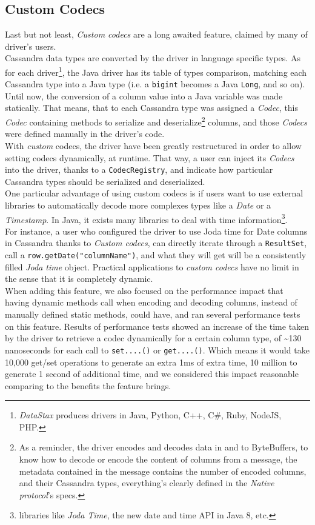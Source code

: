 \documentclass[a4paper]{report}
\newcommand{\ds}{\emph{DataStax\xspace}}
\begin{document}
\subsection{Custom Codecs}
Last but not least, \emph{Custom codecs} are a long awaited feature, claimed by many of driver's users.\\
Cassandra data types are converted by the driver in language specific types. As for each driver\footnote{\ds{} produces drivers in Java, Python, C++, C\#, Ruby, NodeJS, PHP.}, the Java driver has its table of types comparison, matching each Cassandra type into a Java type (i.e. a \verb;bigint; becomes a Java \verb;Long;, and so on). Until now, the conversion of a column value into a Java variable was made statically. That means, that to each Cassandra type was assigned a \emph{Codec}, this \emph{Codec} containing methods to serialize and deserialize\footnote{As a reminder, the driver encodes and decodes data in and to ByteBuffers, to know how to decode or encode the content of columns from a message, the metadata contained in the message contains the number of encoded columns, and their Cassandra types, everything's clearly defined in the \emph{Native protocol}'s specs.} columns, and those \emph{Codecs} were defined manually in the driver's code.\\
With \emph{custom} codecs, the driver have been greatly restructured in order to allow setting codecs dynamically, at runtime. That way, a user can inject its \emph{Codecs} into the driver, thanks to a \verb;CodecRegistry;, and indicate how particular Cassandra types should be serialized and deserialized.\\
One particular advantage of using custom codecs is if users want to use external libraries to automatically decode more complexes types like a \emph{Date} or a \emph{Timestamp}. In Java, it exists many libraries to deal with time information\footnote{libraries like \emph{Joda Time}, the new date and time API in Java 8, etc.}.\\ 
For instance, a user who configured the driver to use Joda time for Date columns in Cassandra thanks to \emph{Custom codecs}, can directly iterate through a \verb;ResultSet;, call a \verb;row.getDate("columnName");, and what they will get will be a consistently filled \emph{Joda time} object. Practical applications to \emph{custom codecs} have no limit in the sense that it is completely dynamic.\\
When adding this feature, we also focused on the performance impact that having dynamic methods call when encoding and decoding columns, instead of manually defined static methods, could have, and ran several performance tests on this feature. Results of performance tests showed an increase of the time taken by the driver to retrieve a codec dynamically for a certain column type, of \textasciitilde{}130 nanoseconds for each call to \verb;set....(); or \verb;get....();. Which means it would take 10,000 get/set operations to generate an extra 1ms of extra time, 10 million to generate 1 second of additional time, and we considered this impact reasonable comparing to the benefits the feature brings.
\end{document}
